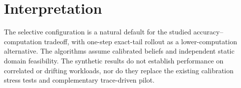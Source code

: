 \documentclass[conference]{IEEEtran}
\begin{document}
\section{Interpretation}
The selective configuration is a natural default for the studied
accuracy--computation tradeoff, with one-step exact-tail rollout as a
lower-computation alternative. The algorithms assume calibrated
beliefs and independent static domain feasibility. The synthetic
results do not establish performance on correlated or drifting
workloads, nor do they replace the existing calibration stress tests
and complementary trace-driven pilot.
\end{document}
